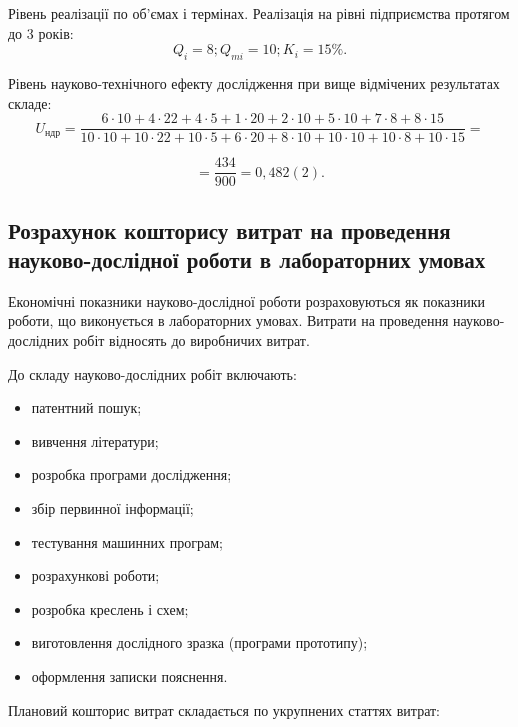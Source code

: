 \begin{longEnumerate}
\item Рівень реалізації по об'ємах і термінах. Реалізація на рівні підприємства протягом до 3 років:
\begin{equation}
Q_i = 8; Q_{mi} = 10; K_i = 15\%. \nonumber
\end{equation}

\item Рівень науково-технічного ефекту дослідження при вище відмічених результатах складе:
\begin{equation}
U_{\text{ндр}} = \frac{6  \cdot  10+4  \cdot  22+4  \cdot  5+1  \cdot  20+2  \cdot  10+5  \cdot  10+7  \cdot  8+8  \cdot  15}{10  \cdot  10+10  \cdot  22+10  \cdot  5+6  \cdot  20+8  \cdot  10+10  \cdot  10+10  \cdot  8+10  \cdot  15} = \nonumber
\end{equation}

\begin{equation}
= \frac{434}{900} = 0,482(2).  \nonumber
\end{equation}
\end{longEnumerate}
  
    \subsection{Розрахунок кошторису витрат на проведення науково-дослідної роботи в лабораторних умовах}

Економічні показники науково-дослідної роботи розраховуються як показники роботи, що виконується в лабораторних умовах. Витрати на проведення науково-дослідних робіт відносять до виробничих витрат.

До складу науково-дослідних робіт включають:
\begin{itemize}
\item патентний пошук;
\item вивчення літератури;
\item розробка програми дослідження;
\item збір первинної інформації;
\item тестування машинних програм;
\item розрахункові роботи;
\item розробка креслень і схем;
\item виготовлення дослідного зразка (програми прототипу);
\item оформлення записки пояснення.
\end{itemize}

Плановий кошторис витрат складається по укрупнених статтях витрат:

